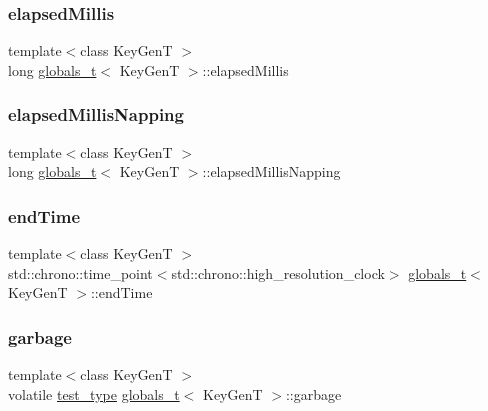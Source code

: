 \mbox{\label{structglobals__t_aa9724d3aea293ee3211f08cb1aa3d34e}} 
\subsubsection{\texorpdfstring{elapsed\+Millis}{elapsedMillis}}
{\footnotesize\ttfamily template$<$class Key\+GenT $>$ \\
long \hyperlink{structglobals__t}{globals\+\_\+t}$<$ Key\+GenT $>$\+::elapsed\+Millis}

\mbox{\label{structglobals__t_a8c6edcc8b8cfd88acd7ad869f8ac446b}} 
\subsubsection{\texorpdfstring{elapsed\+Millis\+Napping}{elapsedMillisNapping}}
{\footnotesize\ttfamily template$<$class Key\+GenT $>$ \\
long \hyperlink{structglobals__t}{globals\+\_\+t}$<$ Key\+GenT $>$\+::elapsed\+Millis\+Napping}

\mbox{\label{structglobals__t_a4e6d795a5fd1a12435a22b57264cee82}} 
\subsubsection{\texorpdfstring{end\+Time}{endTime}}
{\footnotesize\ttfamily template$<$class Key\+GenT $>$ \\
std\+::chrono\+::time\+\_\+point$<$std\+::chrono\+::high\+\_\+resolution\+\_\+clock$>$ \hyperlink{structglobals__t}{globals\+\_\+t}$<$ Key\+GenT $>$\+::end\+Time}

\mbox{\label{structglobals__t_ab2923d797e57d4f17d10eb0ecb8b5b3d}} 
\subsubsection{\texorpdfstring{garbage}{garbage}}
{\footnotesize\ttfamily template$<$class Key\+GenT $>$ \\
volatile \hyperlink{microbench_2main_8cpp_a8c96a4eb128cbef9f7b7aa2f7533202f}{test\+\_\+type} \hyperlink{structglobals__t}{globals\+\_\+t}$<$ Key\+GenT $>$\+::garbage}

